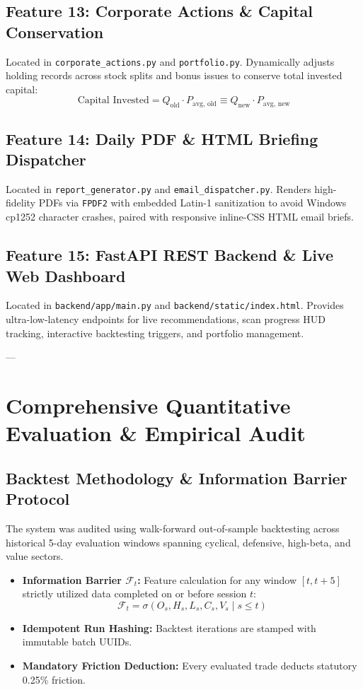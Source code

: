 \documentclass[11pt,a4paper]{article}
\begin{document}
\subsection{Feature 13: Corporate Actions \& Capital Conservation}
Located in \texttt{corporate\_actions.py} and \texttt{portfolio.py}. Dynamically adjusts holding records across stock splits and bonus issues to conserve total invested capital:
\begin{equation}
\text{Capital Invested} = Q_{\text{old}} \cdot P_{\text{avg, old}} \equiv Q_{\text{new}} \cdot P_{\text{avg, new}}
\end{equation}

\subsection{Feature 14: Daily PDF \& HTML Briefing Dispatcher}
Located in \texttt{report\_generator.py} and \texttt{email_dispatcher.py}. Renders high-fidelity PDFs via \texttt{FPDF2} with embedded Latin-1 sanitization to avoid Windows cp1252 character crashes, paired with responsive inline-CSS HTML email briefs.

\subsection{Feature 15: FastAPI REST Backend \& Live Web Dashboard}
Located in \texttt{backend/app/main.py} and \texttt{backend/static/index.html}. Provides ultra-low-latency endpoints for live recommendations, scan progress HUD tracking, interactive backtesting triggers, and portfolio management.

---

\section{Comprehensive Quantitative Evaluation \& Empirical Audit}

\subsection{Backtest Methodology \& Information Barrier Protocol}
The system was audited using walk-forward out-of-sample backtesting across historical 5-day evaluation windows spanning cyclical, defensive, high-beta, and value sectors.
\begin{itemize}[leftmargin=*]
    \item \textbf{Information Barrier $\mathcal{F}_t$:} Feature calculation for any window $[t, t+5]$ strictly utilized data completed on or before session $t$:
    \begin{equation}
    \mathcal{F}_t = \sigma(O_s, H_s, L_s, C_s, V_s \mid s \le t)
    \end{equation}
    \item \textbf{Idempotent Run Hashing:} Backtest iterations are stamped with immutable batch UUIDs.
    \item \textbf{Mandatory Friction Deduction:} Every evaluated trade deducts statutory 0.25\% friction.
\end{itemize}
\end{document}
